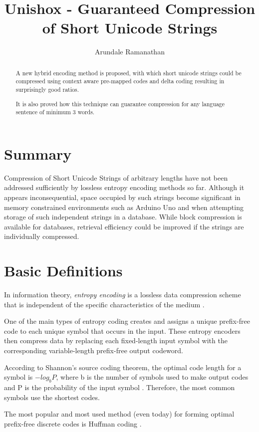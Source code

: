 \documentclass[]{article}
\title{Unishox - Guaranteed Compression of Short Unicode Strings}
\author{Arundale Ramanathan}
\begin{document}
\maketitle

\begin{abstract}
A new hybrid encoding method is proposed, with which short unicode strings could be compressed using context aware pre-mapped codes and delta coding resulting in surprisingly good ratios.

It is also proved how this technique can guarantee compression for any language sentence of minimum 3 words.
\end{abstract}

\section{Summary}

Compression of Short Unicode Strings of arbitrary lengths have not been addressed sufficiently by lossless entropy encoding methods so far.  Although it appears inconsequential, space occupied by such strings become significant in memory constrained environments such as Arduino Uno and when attempting storage of such independent strings in a database. While block compression is available for databases, retrieval efficiency could be improved if the strings are individually compressed.

\section{Basic Definitions}

In information theory, \emph{entropy encoding} is a lossless data compression scheme that is independent of the specific characteristics of the medium \cite{1}.

One of the main types of entropy coding creates and assigns a unique prefix-free code to each unique symbol that occurs in the input. These entropy encoders then compress data by replacing each fixed-length input symbol with the corresponding variable-length prefix-free output codeword.

According to Shannon's source coding theorem, the optimal code length for a symbol is $-log_bP$, where b is the number of symbols used to make output codes and P is the probability of the input symbol \cite{2}. Therefore, the most common symbols use the shortest codes.

The most popular and most used method (even today) for forming optimal prefix-free discrete codes is Huffman coding \cite{3}.
\end{document}

